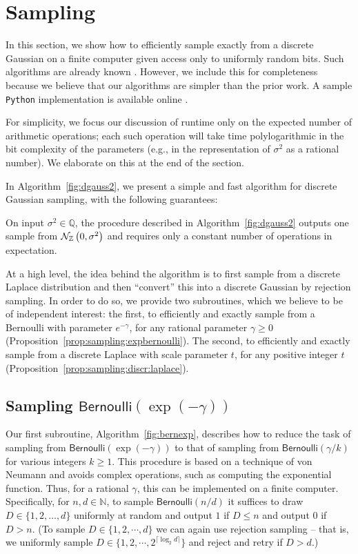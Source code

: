 \documentclass{jpcfinal} %
\newcommand{\dgausss}[2]{{\discN\left(#1,#2\right)}}
\newcommand{\dgauss}[1]{\dgausss{0}{#1}}
\newcommand{\bern}{\mathsf{Bernoulli}}
\begin{document}
\section{Sampling}
\label{sec:sampling}

In this section, we show how to efficiently sample exactly from a discrete Gaussian on a finite computer given access only to uniformly random bits. Such algorithms are already known \citep{Karney16,DuFW20}. However, we include this for completeness because we believe that our algorithms are simpler than the prior work. A sample \texttt{Python} implementation is available online \citep{DGaussGithub}.

For simplicity, we focus our discussion of runtime only on the expected number of arithmetic operations; each such operation will take time polylogarithmic in the bit complexity of the parameters (e.g., in the representation of $\sigma^2$ as a rational number). We elaborate on this at the end of the section. 

In Algorithm~\ref{fig:dgauss2}, we present a simple and fast algorithm for discrete Gaussian sampling, with the following guarantees:
\begin{thm}
  \label{theo:sampling:discrete:gaussian}
  On input $\sigma^2\in\mathbb{Q}$, the procedure described in Algorithm~\ref{fig:dgauss2} outputs one sample from $\dgauss{\sigma^2}$ and requires only a constant number of  operations in expectation.
\end{thm}

At a high level, the idea behind the algorithm is to first sample from a discrete Laplace distribution and then ``convert'' this into a discrete Gaussian by rejection sampling. In order to do so, we provide two subroutines, which we believe to be of independent interest: the first, to efficiently and exactly sample from a Bernoulli with parameter $e^{-\gamma}$, for any rational parameter $\gamma \geq 0$ (Proposition~\ref{prop:sampling:expbernoulli}). The second, to efficiently and exactly sample from a discrete Laplace with scale parameter $t$, for any positive integer $t$ (Proposition~\ref{prop:sampling:discr:laplace}).

\subsection{Sampling $\bern(\exp(-\gamma))$}

Our first subroutine, Algorithm~\ref{fig:bernexp}, describes how to reduce the task of sampling from  $\bern(\exp(-\gamma))$ to that of sampling from $\bern(\gamma/k)$ for various integers $k \ge 1$. 
This procedure is based on a technique of von Neumann \citep{vonNeumann51,Forsythe72} and avoids complex operations, such as computing the exponential function. Thus, for a rational $\gamma$, this can be implemented on a finite computer. Specifically, for $n,d \in \mathbb{N}$, to sample $\bern(n/d)$ it suffices to draw $D \in \{1,2,\dots,d\}$ uniformly at random and output $1$ if $D \le n$ and output $0$ if $D > n$. (To sample $D \in \{1,2,\cdots,d\}$ we can again use rejection sampling -- that is, we uniformly sample $D \in \{1,2,\cdots,2^{\lceil \log_2 d \rceil}\}$ and reject and retry if $D>d$.)
\end{document}
